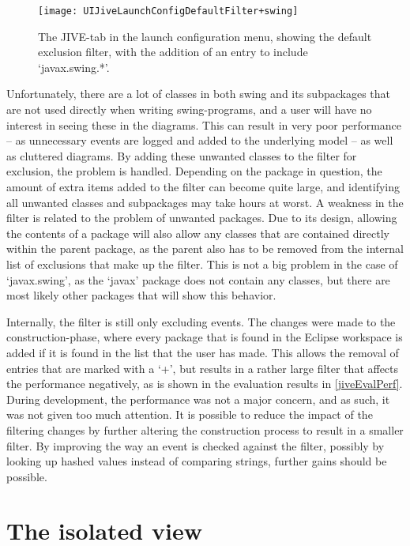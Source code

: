 \begin{figure}[H]
	\centering
	\texttt{[image: UIJiveLaunchConfigDefaultFilter+swing]}
	\caption[The JIVE-tab in the launch configuration menu.]{The JIVE-tab in the launch configuration menu, showing the default exclusion filter, with the addition of an entry to include `javax.swing.*'.}
	\label{fig:UIJiveLaunchConfigDefaultFilter+swing}
\end{figure}

Unfortunately, there are a lot of classes in both swing and its subpackages that are not used directly when writing swing-programs, and a user will have no interest in seeing these in the diagrams.
This can result in very poor performance -- as unnecessary events are logged and added to the underlying model -- as well as cluttered diagrams.
By adding these unwanted classes to the filter for exclusion, the problem is handled.
Depending on the package in question, the amount of extra items added to the filter can become quite large, and identifying all unwanted classes and subpackages may take hours at worst.
A weakness in the filter is related to the problem of unwanted packages.
Due to its design, allowing the contents of a package will also allow any classes that are contained directly within the parent package, as the parent also has to be removed from the internal list of exclusions that make up the filter.
This is not a big problem in the case of `javax.swing', as the `javax' package does not contain any classes, but there are most likely other packages that will show this behavior.

Internally, the filter is still only excluding events.
The changes were made to the construction-phase, where every package that is found in the Eclipse workspace is added if it is found in the list that the user has made.
This allows the removal of entries that are marked with a `+', but results in a rather large filter that affects the performance negatively, as is shown in the evaluation results in \cref{jiveEvalPerf}.
During development, the performance was not a major concern, and as such, it was not given too much attention.
It is possible to reduce the impact of the filtering changes by further altering the construction process to result in a smaller filter.
By improving the way an event is checked against the filter, possibly by looking up hashed values instead of comparing strings, further gains should be possible.


\section{The isolated view}\label{isoView}


